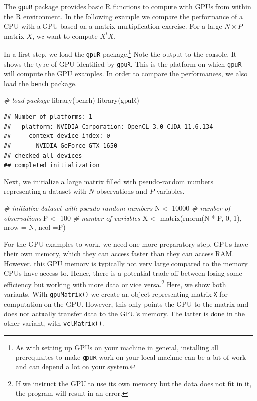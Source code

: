 \documentclass[
  12pt,
]{style/krantz}
\newenvironment{Shaded}{\begin{snugshade}}{\end{snugshade}}
\newcommand{\AttributeTok}[1]{\textcolor[rgb]{0.77,0.63,0.00}{#1}}
\newcommand{\CommentTok}[1]{\textcolor[rgb]{0.56,0.35,0.01}{\textit{#1}}}
\newcommand{\DecValTok}[1]{\textcolor[rgb]{0.00,0.00,0.81}{#1}}
\newcommand{\FunctionTok}[1]{\textcolor[rgb]{0.00,0.00,0.00}{#1}}
\newcommand{\NormalTok}[1]{#1}
\newcommand{\OtherTok}[1]{\textcolor[rgb]{0.56,0.35,0.01}{#1}}
\newcommand{\SpecialCharTok}[1]{\textcolor[rgb]{0.00,0.00,0.00}{#1}}
\begin{document}
The \texttt{gpuR} package provides basic R functions to compute with GPUs from within the R environment. In the following example we compare the performance of a CPU with a GPU based on a matrix multiplication exercise. For a large \(N\times P\) matrix \(X\), we want to compute \(X^tX\).

In a first step, we load the \texttt{gpuR}-package.\footnote{As with setting up GPUs on your machine in general, installing all prerequisites to make \texttt{gpuR} work on your local machine can be a bit of work and can depend a lot on your system.} Note the output to the console. It shows the type of GPU identified by \texttt{gpuR}. This is the platform on which \texttt{gpuR} will compute the GPU examples. In order to compare the performances, we also load the \texttt{bench} package.

\begin{Shaded}
\begin{Highlighting}[]
\CommentTok{\# load package}
\FunctionTok{library}\NormalTok{(bench)}
\FunctionTok{library}\NormalTok{(gpuR)}
\end{Highlighting}
\end{Shaded}

\begin{verbatim}
## Number of platforms: 1
## - platform: NVIDIA Corporation: OpenCL 3.0 CUDA 11.6.134
##   - context device index: 0
##     - NVIDIA GeForce GTX 1650
## checked all devices
## completed initialization
\end{verbatim}

Next, we initialize a large matrix filled with pseudo-random numbers, representing a dataset with \(N\) observations and \(P\) variables.

\begin{Shaded}
\begin{Highlighting}[]
\CommentTok{\# initialize dataset with pseudo{-}random numbers}
\NormalTok{N }\OtherTok{\textless{}{-}} \DecValTok{10000}  \CommentTok{\# number of observations}
\NormalTok{P }\OtherTok{\textless{}{-}} \DecValTok{100} \CommentTok{\# number of variables}
\NormalTok{X }\OtherTok{\textless{}{-}} \FunctionTok{matrix}\NormalTok{(}\FunctionTok{rnorm}\NormalTok{(N }\SpecialCharTok{*}\NormalTok{ P, }\DecValTok{0}\NormalTok{, }\DecValTok{1}\NormalTok{), }\AttributeTok{nrow =}\NormalTok{ N, }\AttributeTok{ncol =}\NormalTok{P)}
\end{Highlighting}
\end{Shaded}

For the GPU examples to work, we need one more preparatory step. GPUs have their own memory, which they can access faster than they can access RAM. However, this GPU memory is typically not very large compared to the memory CPUs have access to. Hence, there is a potential trade-off between losing some efficiency but working with more data or vice versa.\footnote{If we instruct the GPU to use its own memory but the data does not fit in it, the program will result in an error.} Here, we show both variants. With \texttt{gpuMatrix()} we create an object representing matrix \texttt{X} for computation on the GPU. However, this only points the GPU to the matrix and does not actually transfer data to the GPU's memory. The latter is done in the other variant, with \texttt{vclMatrix()}.
\end{document}
